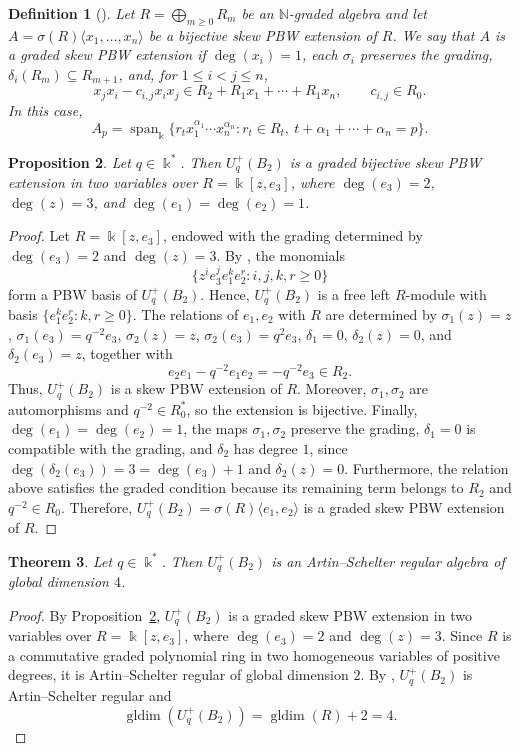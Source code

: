 \documentclass[11pt]{article}
\newtheorem{theorem}{Theorem}[section]
\newtheorem{proposition}[theorem]{Proposition}
\newtheorem{definition}[theorem]{Definition}
\theoremstyle{definition}
\newcommand{\K}{\Bbbk}
\begin{document}
\begin{definition}[{\cite[Proposition~2.7]{Suarez2017KoszulityGradedSkewPBW}}]
Let \(R=\bigoplus_{m\geq0}R_m\) be an \(\mathbb N\)-graded algebra and
let \(A=\sigma(R)\langle x_1,\ldots,x_n\rangle\) be a bijective skew PBW
extension of \(R\). We say that \(A\) is a \emph{graded skew PBW
extension} if \(\deg(x_i)=1\), each \(\sigma_i\) preserves the grading,
\(\delta_i(R_m)\subseteq R_{m+1}\), and, for \(1\leq i<j\leq n\),
$$
x_jx_i-c_{i,j}x_ix_j\in R_2+R_1x_1+\cdots+R_1x_n,
\qquad c_{i,j}\in R_0.
$$
In this case,
$$
A_p=\operatorname{span}_{\K}
\{r_tx_1^{\alpha_1}\cdots x_n^{\alpha_n}:
r_t\in R_t,\ t+\alpha_1+\cdots+\alpha_n=p\}.
$$
\end{definition}
\begin{proposition}
\label{prop:PBW-graduada-UqB2}
Let \(q\in\K^*\). Then \(U_q^{+}(B_2)\) is a graded bijective skew PBW extension
in two variables over \(R=\K[z,e_3]\), where \(\deg(e_3)=2\),
\(\deg(z)=3\), and \(\deg(e_1)=\deg(e_2)=1\).
\end{proposition}
\begin{proof}
Let \(R=\K[z,e_3]\), endowed with the grading determined by
\(\deg(e_3)=2\) and \(\deg(z)=3\). By
\cite[Section~3.1.2]{AndruskiewitschDumas2008}, the monomials
$$
\{z^ie_3^je_1^ke_2^r:i,j,k,r\geq0\}
$$
form a PBW basis of \(U_q^{+}(B_2)\). Hence,
\(U_q^{+}(B_2)\) is a free left \(R\)-module with basis
\(\{e_1^ke_2^r:k,r\geq0\}\).
The relations of \(e_1,e_2\) with \(R\) are determined by
\(\sigma_1(z)=z\), \(\sigma_1(e_3)=q^{-2}e_3\),
\(\sigma_2(z)=z\), \(\sigma_2(e_3)=q^2e_3\),
\(\delta_1=0\), \(\delta_2(z)=0\), and \(\delta_2(e_3)=z\), together with
$$
e_2e_1-q^{-2}e_1e_2=-q^{-2}e_3\in R_2.
$$
Thus, \(U_q^{+}(B_2)\) is a skew PBW extension of \(R\).
Moreover, \(\sigma_1,\sigma_2\) are automorphisms and
\(q^{-2}\in R_0^*\), so the extension is bijective. Finally,
\(\deg(e_1)=\deg(e_2)=1\), the maps \(\sigma_1,\sigma_2\) preserve the
grading, \(\delta_1=0\) is compatible with the grading, and \(\delta_2\)
has degree \(1\), since
\(\deg(\delta_2(e_3))=3=\deg(e_3)+1\) and \(\delta_2(z)=0\).
Furthermore, the relation above satisfies the graded condition because
its remaining term belongs to \(R_2\) and \(q^{-2}\in R_0\). Therefore,
\(U_q^{+}(B_2)=\sigma(R)\langle e_1,e_2\rangle\) is a graded skew PBW
extension of \(R\).
\end{proof}
\begin{theorem}
\label{AS-regular-UqB2}
Let \(q\in\K^*\). Then \(U_q^{+}(B_2)\) is an
Artin--Schelter regular algebra of global dimension \(4\).
\end{theorem}
\begin{proof}
By Proposition~\ref{prop:PBW-graduada-UqB2},
\(U_q^{+}(B_2)\) is a graded skew PBW extension in two variables
over \(R=\K[z,e_3]\), where \(\deg(e_3)=2\) and \(\deg(z)=3\).
Since \(R\) is a commutative graded polynomial ring in two homogeneous
variables of positive degrees, it is Artin--Schelter regular of global
dimension \(2\). By \cite[Theorem~3.10]{GomezSuarez2020},
\(U_q^{+}(B_2)\) is Artin--Schelter regular and
$$\operatorname{gldim}(U_q^{+}(B_2))=\operatorname{gldim}(R)+2=4.$$
\end{proof}
\end{document}
